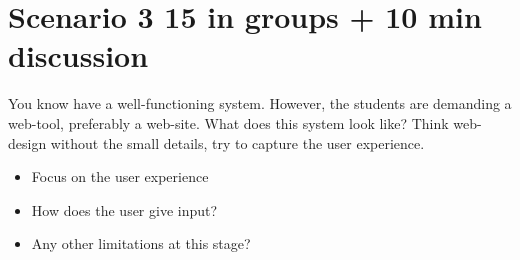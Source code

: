 \section*{Scenario 3 15 in groups + 10 min discussion}
You know have a well-functioning system. However, the students are demanding a web-tool, preferably a web-site. What does this system look like? Think web-design without the small details, try to capture the user experience.

\begin{itemize}
\item Focus on the user experience
\item How does the user give input?
\item Any other limitations at this stage?
\end{itemize}
